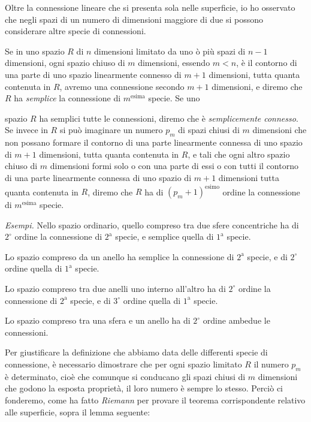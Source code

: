 \documentclass{article}
\begin{document}
Oltre la connessione lineare che si presenta sola nelle superficie, io ho osservato che negli spazi di un numero di dimensioni maggiore di due si possono considerare altre specie di connessioni.

Se in uno spazio $R$ di $n$ dimensioni limitato da uno ò più spazi di $n-1$ dimensioni, ogni spazio chiuso di $m$ dimensioni, essendo $m < n$, è il contorno di una parte di uno spazio linearmente connesso di $m+1$ dimensioni, tutta quanta contenuta in $R$, avremo una connessione secondo $m+1$ dimensioni, e diremo che $R$ ha \emph{semplice} la connessione di $m^{\text{esima}}$ specie. Se uno

spazio $R$ ha semplici tutte le connessioni, diremo che è \emph{semplicemente connesso}. Se invece in $R$ si può imaginare un numero $p_{m}$ di spazi chiusi di $m$ dimensioni che non possano formare il contorno di una parte linearmente connessa di uno spazio di $m+1$ dimensioni, tutta quanta contenuta in $R$, e tali che ogni altro spazio chiuso di $m$ dimensioni formi solo o con una parte di essi o con tutti il contorno di una parte linearmente connessa di uno spazio di $m+1$ dimensioni tutta quanta contenuta in $R$, diremo che $R$ ha di $(p_{m}+1)^{\text{esimo}}$ ordine la connessione di $m^{\text{esima}}$ specie.

\emph{Esempi.} Nello spazio ordinario, quello compreso tra due sfere concentriche ha di $2^{\circ}$ ordine la connessione di $2^{\text{a}}$ specie, e semplice quella di $1^{\text{a}}$ specie.

Lo spazio compreso da un anello ha semplice la connessione di $2^{\text{a}}$ specie, e di $2^{\circ}$ ordine quella di $1^{\text{a}}$ specie.

Lo spazio compreso tra due anelli uno interno all'altro ha di $2^{\circ}$ ordine la connessione di $2^{\text{a}}$ specie, e di $3^{\circ}$ ordine quella di $1^{\text{a}}$ specie.

Lo spazio compreso tra una sfera e un anello ha di $2^{\circ}$ ordine ambedue le connessioni.

Per giustificare la definizione che abbiamo data delle differenti specie di connessione, è necessario dimostrare che per ogni spazio limitato $R$ il numero $p_{m}$ è determinato, cioè che comunque si conducano gli spazi chiusi di $m$ dimensioni che godono la esposta proprietà, il loro numero è sempre lo stesso. Perciò ci fonderemo, come ha fatto \emph{Riemann} per provare il teorema corrispondente relativo alle superficie, sopra il lemma seguente:
\end{document}
